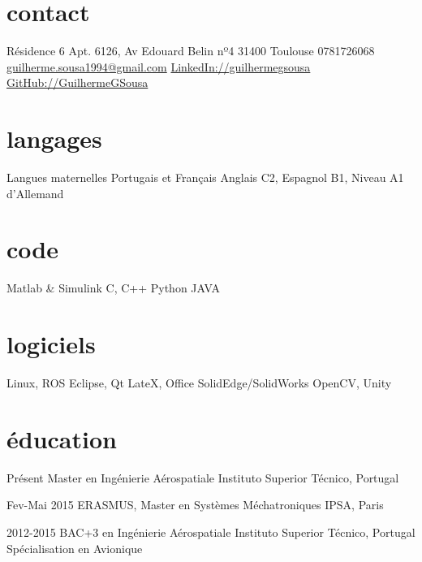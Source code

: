 \documentclass[a4paper]{friggeri-cv} %
\begin{document}


\begin{aside} %
\section{contact}
Résidence 6 Apt. 6126, Av Edouard Belin nº4
31400 Toulouse
0781726068
\href{mailto:guilherme.sousa1994@gmail.com}{guilherme.sousa1994\newline @gmail.com}
\href{https://www.linkedin.com/in/guilhermegsousa}{LinkedIn://guilhermegsousa}
\href{https://github.com/GuilhermeGSousa}{GitHub://GuilhermeGSousa}
\section{langages}
Langues maternelles Portugais et Français 
Anglais C2,
Espagnol B1,
Niveau A1 d'Allemand
\section{code}
Matlab \& Simulink
C, C++
Python
JAVA
\section{logiciels}
Linux, ROS
Eclipse, Qt
LateX, Office
SolidEdge/SolidWorks
OpenCV, Unity
\end{aside}


\section{éducation}

\begin{entrylist}


\entry
{Présent}
{Master {\normalfont en Ingénierie Aérospatiale}}
{Instituto Superior Técnico, Portugal}
{}%


\entry
{Fev-Mai 2015}
{ERASMUS, Master {\normalfont en Systèmes Méchatroniques} }
{IPSA, Paris}
{}

\entry
{2012-2015}
{BAC+3 {\normalfont en Ingénierie Aérospatiale}}
{Instituto Superior Técnico, Portugal}
{Spécialisation en Avionique}


\end{entrylist}
\end{document}
